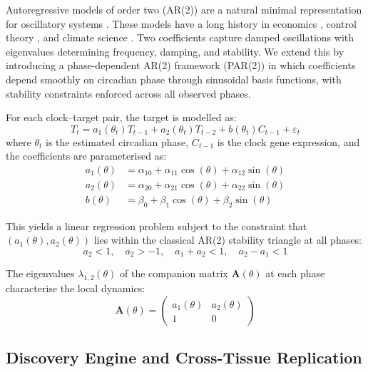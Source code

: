 \documentclass[11pt,letterpaper]{article}
\begin{document}
Autoregressive models of order two (AR(2)) are a natural minimal representation for oscillatory systems \citep{hamilton1994time, box2015time}. These models have a long history in economics \citep{sims1980macroeconomics}, control theory \citep{ogata2010modern}, and climate science \citep{hasselmann1976stochastic}. Two coefficients capture damped oscillations with eigenvalues determining frequency, damping, and stability. We extend this by introducing a phase-dependent AR(2) framework (PAR(2)) in which coefficients depend smoothly on circadian phase through sinusoidal basis functions, with stability constraints enforced across all observed phases.

For each clock--target pair, the target is modelled as:
\begin{equation}
T_t = a_1(\theta_t) T_{t-1} + a_2(\theta_t) T_{t-2} + b(\theta_t) C_{t-1} + \varepsilon_t
\label{eq:par2}
\end{equation}
where $\theta_t$ is the estimated circadian phase, $C_{t-1}$ is the clock gene expression, and the coefficients are parameterised as:
\begin{align}
a_1(\theta) &= \alpha_{10} + \alpha_{11}\cos(\theta) + \alpha_{12}\sin(\theta) \\
a_2(\theta) &= \alpha_{20} + \alpha_{21}\cos(\theta) + \alpha_{22}\sin(\theta) \\
b(\theta) &= \beta_0 + \beta_1\cos(\theta) + \beta_2\sin(\theta)
\end{align}

This yields a linear regression problem subject to the constraint that $(a_1(\theta), a_2(\theta))$ lies within the classical AR(2) stability triangle at all phases:
\begin{equation}
a_2 < 1, \quad a_2 > -1, \quad a_1 + a_2 < 1, \quad a_2 - a_1 < 1
\end{equation}

The eigenvalues $\lambda_{1,2}(\theta)$ of the companion matrix $\mathbf{A}(\theta)$ at each phase characterise the local dynamics:
\begin{equation}
\mathbf{A}(\theta) = \begin{pmatrix} a_1(\theta) & a_2(\theta) \\ 1 & 0 \end{pmatrix}
\end{equation}

\subsection{Discovery Engine and Cross-Tissue Replication}
\end{document}
